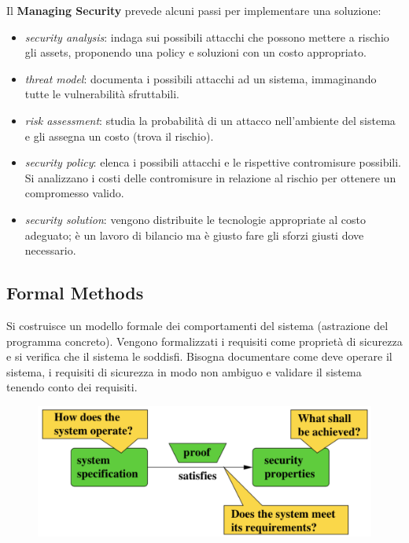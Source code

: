 \documentclass[11pt, a4paper, twoside, italian]{report}
\theoremstyle{plain}
\begin{document}
\noindent
Il \textbf{Managing Security} prevede alcuni passi per implementare una soluzione:
\begin{itemize}
	\item \textit{security analysis}: indaga sui possibili attacchi che possono mettere a rischio gli assets, proponendo una policy e soluzioni con un costo appropriato.
	\item \textit{threat model}: documenta i possibili attacchi ad un sistema, immaginando tutte le vulnerabilità sfruttabili.
	\item \textit{risk assessment}: studia la probabilità di un attacco nell'ambiente del sistema e gli assegna un costo (trova il rischio).
	\item \textit{security policy}: elenca i possibili attacchi e le rispettive contromisure possibili. Si analizzano i costi delle contromisure in relazione al rischio per ottenere un compromesso valido.
	\item \textit{security solution}: vengono distribuite le tecnologie appropriate al costo adeguato; è un lavoro di bilancio ma è giusto fare gli sforzi giusti dove necessario.
\end{itemize}


\subsection*{Formal Methods}
\begin{multicols}{2}
\noindent
Si costruisce un modello formale dei comportamenti del sistema (astrazione del programma concreto). Vengono formalizzati i requisiti come proprietà di sicurezza e si verifica che il sistema le soddisfi. Bisogna documentare come deve operare il sistema, i requisiti di sicurezza in modo non ambiguo e validare il sistema tenendo conto dei requisiti.
\columnbreak
\begin{figure}[H]
	\centering
	\includegraphics[scale=0.4]{formalmethods}
\end{figure}
\end{multicols}
\end{document}
